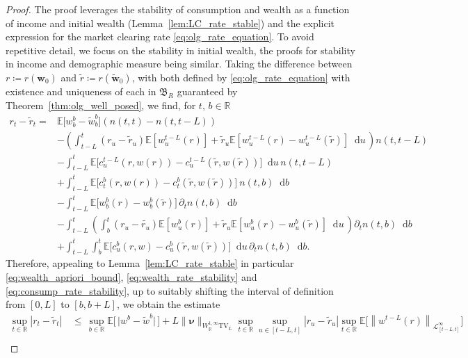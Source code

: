\documentclass[11pt,oneside,english,reqno,dvipsnames,table]{amsart}
\numberwithin{equation}{section}
\theoremstyle{plain}
\theoremstyle{definition}
\theoremstyle{remark}
\theoremstyle{plain}
\theoremstyle{plain}
\theoremstyle{plain}
\theoremstyle{plain}
\theoremstyle{plain}
\theoremstyle{plain}
\theoremstyle{plain}
\newcommand{\TV}{\text{TV}}
\newcommand{\bw}{\mathbf{w}}
\newcommand{\dd}{\mathop{}\!\mathrm{d}}
\newcommand{\mbE}{\mathbb{E}}
\newcommand{\mbR}{\mathbb{R}}
\newcommand{\mfB}{\mathfrak{B}}
\newcommand{\msL}{\mathscr{L}}
\newcommand{\bnu}{\boldsymbol{\nu}}
\numberwithin{thm}{section}
\begin{document}
\begin{proof}
    The proof leverages the stability of consumption and wealth as a function of income and initial wealth (Lemma~\ref{lem:LC_rate_stable}) and the explicit expression for the market clearing rate \eqref{eq:olg_rate_equation}. To avoid repetitive detail, we focus on the stability in initial wealth, the proofs for stability in income and demographic measure being similar. Taking the difference between $r\coloneqq r(\bw_0)$ and $\tilde{r}\coloneqq r(\tilde{\bw}_0)$, with both defined by \eqref{eq:olg_rate_equation} with existence and uniqueness of each in $\mfB_R$ guaranteed by Theorem~\ref{thm:olg_well_posed}, we find, for $t,\, b\in \mbR$ 
    \begin{align*}
        r_t-\tilde{r}_t = & \mbE\big[w^{b}_{b}-\tilde{w}^{b}_{b}\big] \left(n(t,t)-n(t,t-L)\right)\\
        &-\left(\int_{t-L}^{t} (r_u-\tilde{r}_u) \mbE\left[w^{t-L}_u(r)\right] + \tilde{r}_u\mbE\left[w^{t-L}_u(r) - w^{t-L}_u(\tilde{r})\right]\dd u \,\right)n(t,t-L) \\
       &- \int_{t-L}^{t}\mbE\big[c^{t-L}_u(r,w(r))-c^{t-L}_u(\tilde{r},w(\tilde{r}))\big] \dd u \,n(t,t-L)\\
       &+ \int_{t-L}^{t} \mbE\big[ c^b_{t}(r,w(r))- c^b_t(\tilde{r},w(\tilde{r}))\big] \ n(t,b)\dd b\\
&- \int_{t-L}^{t} \mbE\big[w^b_b(r) -w^b_b(\tilde{r})\big] \, \partial_t n(t,b)\dd b\\
       &- \int_{t-L}^{t} \left(\int_b^{t} (r_u -\tilde{r_u})\mbE[w^b_u(r)] +\tilde{r}_u \mbE[w^b_u(r)-w^b_u(\tilde{r})] \dd u \,\right) \partial_t n(t,b)\dd b\\
       &+\int_{t-L}^t \int_b^t \mbE\big[c^b_u(r,w)-c^b_u(\tilde{r},w(\tilde{r}))\big] \dd u \, \partial_t n(t,b)\dd b.
    \end{align*}
    Therefore, appealing to  Lemma~\ref{lem:LC_rate_stable} in particular \eqref{eq:wealth_apriori_bound}, \eqref{eq:wealth_rate_stability} and \eqref{eq:consump_rate_stability}, up to suitably shifting the interval of definition from $[0,L]$ to $[b,b+L]$,  we obtain the estimate 
    \begin{align*}
    	\sup_{t \in \mbR} |r_t-\tilde{r}_t| \,&\leq  \,  \sup_{b\in \mbR}\mbE\Big[\, \big|w^{b} - \tilde{w}^{b}\big|\,\Big] + L\|\bnu\|_{W^{1,\infty}_{\mbR}\TV_L} \sup_{t\in \mbR}\sup_{u\in [t-L,t]} |r_u-\tilde{r}_u| \sup_{t \in \mbR}\mbE\Big[\left\|w^{t-L}(r)\right\|_{\msL^\infty_{[t-L,t]}}\Big]\\

\end{align*}
\end{proof}
\end{document}
